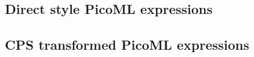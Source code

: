 \subsection{Direct style PicoML expressions}



\newpage

\subsection{CPS transformed PicoML expressions}


